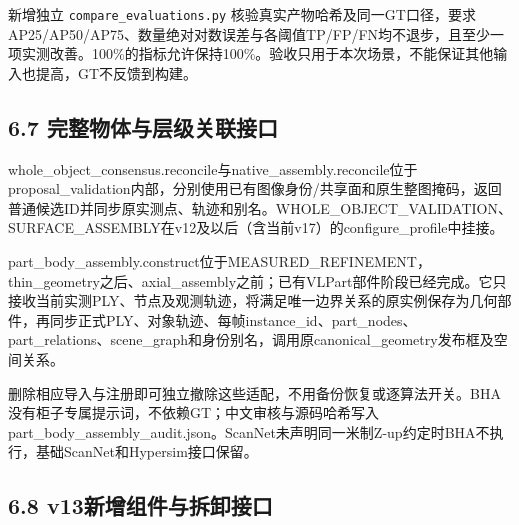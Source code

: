 \documentclass[UTF8,fontset=fandol]{ctexart}
\begin{document}
新增独立 \texttt{compare\_\allowbreak{}evaluations.\allowbreak{}py} 核验真实产物哈希及同一GT口径，要求AP25/AP50/AP75、数量绝对对数误差与各阈值TP/FP/FN均不退步，且至少一项实测改善。100\%的指标允许保持100\%。验收只用于本次场景，不能保证其他输入也提高，GT不反馈到构建。



\subsection*{6.7 完整物体与层级关联接口}

whole\_object\_consensus.reconcile与native\_assembly.reconcile位于proposal\_validation内部，分别使用已有图像身份/共享面和原生整图掩码，返回普通候选ID并同步原实测点、轨迹和别名。WHOLE\_OBJECT\_VALIDATION、SURFACE\_ASSEMBLY在v12及以后（含当前v17）的configure\_profile中挂接。



part\_body\_assembly.construct位于MEASURED\_REFINEMENT，thin\_geometry之后、axial\_assembly之前；已有VLPart部件阶段已经完成。它只接收当前实测PLY、节点及观测轨迹，将满足唯一边界关系的原实例保存为几何部件，再同步正式PLY、对象轨迹、每帧instance\_id、part\_nodes、part\_relations、scene\_graph和身份别名，调用原canonical\_geometry发布框及空间关系。



删除相应导入与注册即可独立撤除这些适配，不用备份恢复或逐算法开关。BHA没有柜子专属提示词，不依赖GT；中文审核与源码哈希写入part\_body\_assembly\_audit.json。ScanNet未声明同一米制Z-up约定时BHA不执行，基础ScanNet和Hypersim接口保留。



\subsection*{6.8 v13新增组件与拆卸接口}
\end{document}
